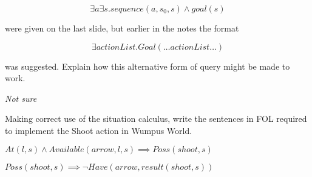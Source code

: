 \documentclass{supervision}
\begin{document}
\begin{questions}
      \begin{equation*}
        \exists a \exists s. {sequence}(a, s_0, s) \land {goal}(s)
      \end{equation*}

      were given on the last slide, but earlier in the notes the format

      \begin{equation*}
        \exists {actionList}.{Goal}(\ldots {actionList} \ldots)
      \end{equation*}

      was suggested. Explain how this alternative form of query might be made to
      work.
      \begin{solution}
        \emph{Not sure}
      \end{solution}

    \question Making correct use of the situation calculus, write the sentences
      in FOL required to implement the Shoot action in Wumpus World.
      \begin{solution}
        ${At}(l, s) \land {Available}({arrow}, l, s)\implies {Poss}({shoot}, s)$

        ${Poss}({shoot}, s) \implies \lnot Have({arrow}, {result}({shoot}, s))$
      \end{solution}

  \end{questions}
\end{document}
